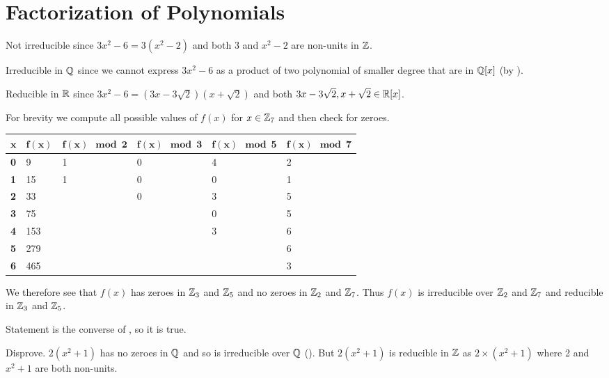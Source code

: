\section{Factorization of Polynomials}
\begin{questions}
    \item \begin{partquestions}{\alph*}
        \item Not irreducible since $3x^2 - 6 = 3(x^2-2)$ and both 3 and $x^2-2$ are non-units in $\mathbb{Z}$.
        \item Irreducible in $\mathbb{Q}$ since we cannot express $3x^2-6$ as a product of two polynomial of smaller degree that are in $\mathbb{Q}[x]$ (by ).
        \item Reducible in $\mathbb{R}$ since $3x^2 - 6 = (3x-3\sqrt2)(x+\sqrt2)$ and both $3x-3\sqrt2, x+\sqrt2 \in \mathbb{R}[x]$.
    \end{partquestions}

    \item For brevity we compute all possible values of $f(x)$ for $x \in \mathbb{Z}_7$ and then check for zeroes.
    \begin{table}[H]
        \centering
        \begin{tabular}{|l|l|l|l|l|l|}
            \hline
            $\boldsymbol{x}$ & $\boldsymbol{f(x)}$ & $\boldsymbol{f(x) \mod2}$ & $\boldsymbol{f(x) \mod3}$ & $\boldsymbol{f(x) \mod5}$ & $\boldsymbol{f(x) \mod7}$ \\ \hline
            \textbf{0} & 9 & 1 & 0 & 4 & 2 \\ \hline
            \textbf{1} & 15 & 1 & 0 & 0 & 1 \\ \hline
            \textbf{2} & 33 &  & 0 & 3 & 5 \\ \hline
            \textbf{3} & 75 &  &  & 0 & 5 \\ \hline
            \textbf{4} & 153 &  &  & 3 & 6 \\ \hline
            \textbf{5} & 279 &  &  &  & 6 \\ \hline
            \textbf{6} & 465 &  &  &  & 3 \\ \hline
        \end{tabular}
    \end{table}
    We therefore see that $f(x)$ has zeroes in $\mathbb{Z}_3$ and $\mathbb{Z}_5$ and no zeroes in $\mathbb{Z}_2$ and $\mathbb{Z}_7$. Thus $f(x)$ is irreducible over $\mathbb{Z}_2$ and $\mathbb{Z}_7$ and reducible in $\mathbb{Z}_3$ and $\mathbb{Z}_5$.

    \item \begin{partquestions}{\alph*}
        \item Statement is the converse of , so it is true.
        \item Disprove. $2(x^2+1)$ has no zeroes in $\mathbb{Q}$ and so is irreducible over $\mathbb{Q}$ (). But $2(x^2+1)$ is reducible in $\mathbb{Z}$ as $2 \times (x^2 + 1)$ where 2 and $x^2 + 1$ are both non-units.
    \end{partquestions}


\end{questions}
